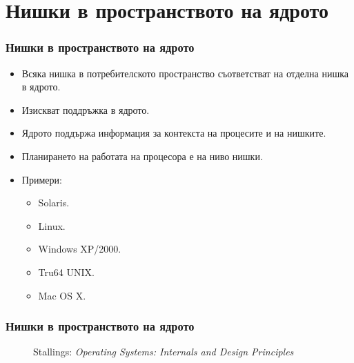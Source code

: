 \documentclass[ignorenonframetext, hyperref=unicode]{beamer}
\begin{document}
\section{Нишки в пространството на ядрото}

\begin{frame}\frametitle{Нишки в пространството на ядрото}
\begin{itemize}
\item Всяка нишка в потребителското пространство съответстват на отделна нишка в
ядрото.
\item Изискват поддръжка в ядрото.
\item Ядрото поддържа информация за контекста на процесите и на нишките.
\item Планирането на работата на процесора е на ниво нишки.
\item Примери:
\begin{itemize}
  \item Solaris.
  \item Linux.
  \item Windows XP/2000.
  \item Tru64 UNIX.
  \item Mac OS X.
\end{itemize}
\end{itemize}
\end{frame}


\begin{frame}\frametitle{Нишки в пространството на ядрото}
\begin{figure}[h]
\center
{}
\caption{Stallings: {\em Operating Systems: Internals and Design Principles}}
\end{figure}
\end{frame}
\end{document}
